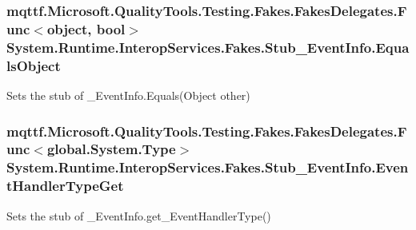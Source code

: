 \hypertarget{class_system_1_1_runtime_1_1_interop_services_1_1_fakes_1_1_stub___event_info_aa256bb76a6b560c426ab03692615442a}{
\subsubsection[{Equals\-Object}]{\setlength{\rightskip}{0pt plus 5cm}mqttf.\-Microsoft.\-Quality\-Tools.\-Testing.\-Fakes.\-Fakes\-Delegates.\-Func$<$object, bool$>$ System.\-Runtime.\-Interop\-Services.\-Fakes.\-Stub\-\_\-\-Event\-Info.\-Equals\-Object}}\label{class_system_1_1_runtime_1_1_interop_services_1_1_fakes_1_1_stub___event_info_aa256bb76a6b560c426ab03692615442a}


Sets the stub of \-\_\-\-Event\-Info.\-Equals(\-Object other)

\hypertarget{class_system_1_1_runtime_1_1_interop_services_1_1_fakes_1_1_stub___event_info_acf781527e8ef86795e6794af1403bc1f}{
\subsubsection[{Event\-Handler\-Type\-Get}]{\setlength{\rightskip}{0pt plus 5cm}mqttf.\-Microsoft.\-Quality\-Tools.\-Testing.\-Fakes.\-Fakes\-Delegates.\-Func$<$global.\-System.\-Type$>$ System.\-Runtime.\-Interop\-Services.\-Fakes.\-Stub\-\_\-\-Event\-Info.\-Event\-Handler\-Type\-Get}}\label{class_system_1_1_runtime_1_1_interop_services_1_1_fakes_1_1_stub___event_info_acf781527e8ef86795e6794af1403bc1f}


Sets the stub of \-\_\-\-Event\-Info.\-get\-\_\-\-Event\-Handler\-Type()

